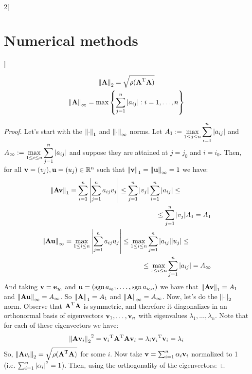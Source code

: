 \documentclass[../../../main_math.tex]{subfiles}
\begin{document}
\begin{multicols}{2}[\section{Numerical methods}]
\begin{proposition}
\begin{gather*}
      \left\|\boldsymbol{\mathrm{A}}\right\|_2=\sqrt{\rho({\boldsymbol{\mathrm{A}}}^{\mathrm{T}}\boldsymbol{\mathrm{A}})}\\
      \left\|\boldsymbol{\mathrm{A}}\right\|_\infty=\max\left\{\sum_{j=1}^n\abs{a_{ij}}:i=1,\ldots,n\right\}
    \end{gather*}
  \end{proposition}
  \begin{proof}
    Let's start with the $\left\|\cdot\right\|_1$ and $\left\|\cdot\right\|_\infty$ norms. Let $\displaystyle A_1:=\max_{1\leq j\leq n} \sum_{i=1}^n\abs{a_{ij}}$ and $\displaystyle A_\infty:=\max_{1\leq i\leq n} \sum_{j=1}^n\abs{a_{ij}}$ and suppose they are attained at $j=j_0$ and $i=i_0$. Then, for all $\boldsymbol{\mathrm{v}}=(v_j),\boldsymbol{\mathrm{u}}=(u_j)\in\mathbb{R}^n$ such that $\left\|\boldsymbol{\mathrm{v}}\right\|_1=\left\|\boldsymbol{\mathrm{u}}\right\|_\infty=1$ we have:
    \begin{align*}
      \begin{split}
        \norm{\vf{Av}}_1 & =\sum_{i=1}^n\abs{\sum_{j=1}^n a_{ij}v_j}\leq\sum_{j=1}^n\abs{v_j}\sum_{i=1}^n\abs{a_{ij}}\leq \\
                         & \hspace*{4.5cm}\leq \sum_{j=1}^n\abs{v_j}A_1 = A_1
      \end{split} \\
      \begin{split}
        \norm{\vf{Au}}_\infty & =\max_{1\leq i\leq n}\abs{\sum_{j=1}^n a_{ij}u_j}\leq\max_{1\leq i\leq n}\sum_{j=1}^n\abs{a_{ij}}\abs{u_j}\leq \\
                              & \hspace*{4cm}\leq \max_{1\leq i\leq n}\sum_{j=1}^n\abs{a_{ij}}= A_\infty
      \end{split}
    \end{align*}
    And taking $\boldsymbol{\mathrm{v}}=\boldsymbol{\mathrm{e}}_{j_0}$ and $\boldsymbol{\mathrm{u}}=(\operatorname{sgn}{a_{i_01}}, \ldots, \operatorname{sgn}{a_{i_0n}})$ we have that $\left\|\boldsymbol{\mathrm{Av}}\right\|_1=A_1$ and $\left\|\boldsymbol{\mathrm{Au}}\right\|_\infty=A_\infty$. So $\left\|\boldsymbol{\mathrm{A}}\right\|_1=A_1$ and $\left\|\boldsymbol{\mathrm{A}}\right\|_\infty=A_\infty$. Now, let's do the $\left\|\cdot\right\|_2$ norm. Observe that ${\boldsymbol{\mathrm{A}}}^{\mathrm{T}}\boldsymbol{\mathrm{A}}$ is symmetric, and therefore it diagonalizes in an orthonormal basis of eigenvectors $\boldsymbol{\mathrm{v}}_1, \ldots, \boldsymbol{\mathrm{v}}_n$ with eigenvalues $\lambda_1, \ldots, \lambda_n$. Note that for each of these eigenvectors we have:
    $$
      {\left\|\boldsymbol{\mathrm{A}}\boldsymbol{\mathrm{v}}_i\right\|_2}^2={\boldsymbol{\mathrm{v}}_i}^{\mathrm{T}}{\boldsymbol{\mathrm{A}}}^{\mathrm{T}}\boldsymbol{\mathrm{A}}\boldsymbol{\mathrm{v}}_i=\lambda_i{\boldsymbol{\mathrm{v}}_i}^{\mathrm{T}}\boldsymbol{\mathrm{v}}_i=\lambda_i
    $$
    So, $\left\|\boldsymbol{\mathrm{A}}v_i\right\|_2=\sqrt{\rho({\boldsymbol{\mathrm{A}}}^{\mathrm{T}}\boldsymbol{\mathrm{A}})}$ for some $i$. Now take $\boldsymbol{\mathrm{v}}=\sum_{i=1}^n\alpha_i\boldsymbol{\mathrm{v}}_i$ normalized to 1 (i.e. $\sum_{i=1}^n\abs{\alpha_i}^2=1$). Then, using the orthogonality of the eigenvectors:

\end{proof}
\end{multicols}
\end{document}
